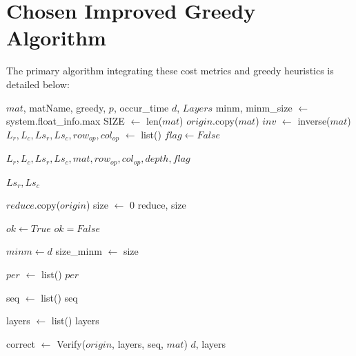 \chapter{Chosen Improved Greedy Algorithm}
The primary algorithm integrating these cost metrics and greedy heuristics is detailed below:
\begin{algorithm}
\caption{Chosen Improved Greedy Algorithm}
\footnotesize
\begin{algorithmic}[1]
\Require $mat$, matName, greedy, $p$, occur\_time
\Ensure $d$, $Layers$
\State minm, minm\_size $\leftarrow$ system.float\_info.max
\State SIZE $\leftarrow$ len($mat$)
\State $origin$.copy($mat$)
\State $inv$ $\leftarrow$ inverse($mat$)
\State $L_{r}, L_{c}, Ls_{r}, Ls_{c}, row_{op}, col_{op}$ $\leftarrow$ list()
\State $flag \leftarrow False$

	\State \Return $L_{r}, L_{c}, Ls_{r}, Ls_{c}, mat, row_{op}, col_{op}, depth, flag$
\EndFunction

	\State \Return
\EndIf

	\State \Return $Ls_{r}, Ls_{c}$
\EndFunction

\State $reduce$.copy($origin$)
\State size $\leftarrow$ 0
	\State \Return reduce, size
\EndFunction

\State $ok \leftarrow True$
	\State $ok = False$
\EndIf

	\State \Return
\EndIf

\State $minm \leftarrow d$
\State size\_minm $\leftarrow$ size

\State $per$ $\leftarrow$ list()
	\State \Return $per$
\EndFunction

\State seq $\leftarrow$ list()
	\State \Return seq
\EndFunction

\State layers $\leftarrow$ list()
	\State \Return layers
\EndFunction

\State correct $\leftarrow$ Verify($origin$, layers, seq, $mat$)
	\State \Return
\EndIf
\State \Return $d$, layers
\end{algorithmic}
\end{algorithm}